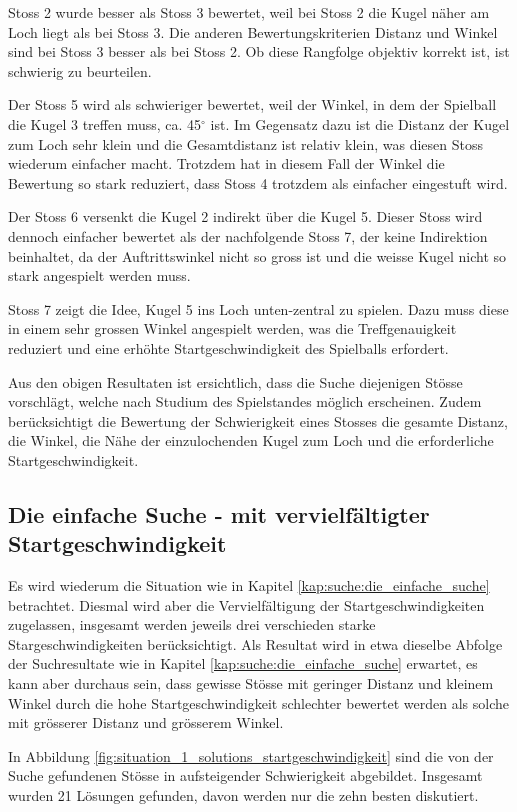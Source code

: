 Stoss 2 wurde besser als Stoss 3 bewertet, weil bei Stoss 2 die Kugel näher am Loch liegt als bei Stoss 3. Die anderen
Bewertungskriterien Distanz und Winkel sind bei Stoss 3 besser als bei Stoss 2.
Ob diese Rangfolge objektiv korrekt ist, ist schwierig zu beurteilen.

Der Stoss 5 wird als schwieriger bewertet, weil der Winkel, in dem der Spielball die Kugel 3 treffen muss, ca. 45$^{\circ}$ ist.
Im Gegensatz dazu ist die Distanz der Kugel zum Loch sehr klein und die Gesamtdistanz ist relativ klein, was diesen Stoss
wiederum einfacher macht. Trotzdem hat in diesem Fall der Winkel die Bewertung so stark reduziert, dass Stoss 4 trotzdem
als einfacher eingestuft wird.

Der Stoss 6 versenkt die Kugel 2 indirekt über die Kugel 5. Dieser Stoss wird dennoch einfacher bewertet als der
nachfolgende Stoss 7, der keine Indirektion beinhaltet, da der Auftrittswinkel nicht so gross ist und die weisse Kugel
nicht so stark angespielt werden muss.

Stoss 7 zeigt die Idee, Kugel 5 ins Loch unten-zentral zu spielen.
Dazu muss diese in einem sehr grossen Winkel angespielt werden, was die Treffgenauigkeit reduziert und eine
erhöhte Startgeschwindigkeit des Spielballs erfordert.

Aus den obigen Resultaten ist ersichtlich, dass die Suche diejenigen Stösse vorschlägt, welche nach Studium des Spielstandes
möglich erscheinen. Zudem berücksichtigt die Bewertung der Schwierigkeit eines Stosses die gesamte Distanz, die Winkel, die Nähe
der einzulochenden Kugel zum Loch und die erforderliche Startgeschwindigkeit.
\newpage

\subsection{Die einfache Suche - mit vervielfältigter Startgeschwindigkeit}
Es wird wiederum die Situation wie in Kapitel \ref{kap:suche:die_einfache_suche} betrachtet. Diesmal wird aber die Vervielfältigung der Startgeschwindigkeiten
zugelassen, insgesamt werden jeweils drei verschieden starke Stargeschwindigkeiten berücksichtigt.
Als Resultat wird in etwa dieselbe Abfolge der Suchresultate wie in Kapitel \ref{kap:suche:die_einfache_suche} erwartet, es kann aber durchaus
sein, dass gewisse Stösse mit geringer Distanz und kleinem Winkel durch die hohe Startgeschwindigkeit schlechter bewertet werden
als solche mit grösserer Distanz und grösserem Winkel.

In Abbildung \ref{fig:situation_1_solutions_startgeschwindigkeit} sind die von der Suche gefundenen Stösse in aufsteigender Schwierigkeit abgebildet.
Insgesamt wurden 21 Lösungen gefunden, davon werden nur die zehn besten diskutiert.

